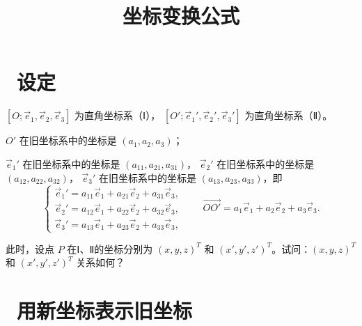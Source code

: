 \documentclass[UTF8,11pt]{ctexart}
\title{坐标变换公式}
\date{}
\theoremstyle{cnthm}
\begin{document}
\maketitle

\section{\ 设定}

$[O;\vec e_1,\vec e_2,\vec e_3]$ 为直角坐标系（Ⅰ），
$[O';\vec e_1',\vec e_2',\vec e_3']$ 为直角坐标系（Ⅱ）。

$O'$ 在旧坐标系中的坐标是 $(a_1,a_2,a_3)$；

$\vec e_1'$ 在旧坐标系中的坐标是 $(a_{11},a_{21},a_{31})$，
$\vec e_2'$ 在旧坐标系中的坐标是 $(a_{12},a_{22},a_{32})$，
$\vec e_3'$ 在旧坐标系中的坐标是 $(a_{13},a_{23},a_{33})$，即
\[
\begin{cases}
\vec e_1'=a_{11}\vec e_1+a_{21}\vec e_2+a_{31}\vec e_3,\\
\vec e_2'=a_{12}\vec e_1+a_{22}\vec e_2+a_{32}\vec e_3,\\
\vec e_3'=a_{13}\vec e_1+a_{23}\vec e_2+a_{33}\vec e_3,
\end{cases}
\qquad
\overrightarrow{OO'}=a_1\vec e_1+a_2\vec e_2+a_3\vec e_3 .
\]

此时，设点 $P$ 在Ⅰ、Ⅱ的坐标分别为 $(x,y,z)^T$ 和
$(x',y',z')^T$。试问：$(x,y,z)^T$ 和 $(x',y',z')^T$
关系如何？

\section{\ 用新坐标表示旧坐标}
\end{document}
